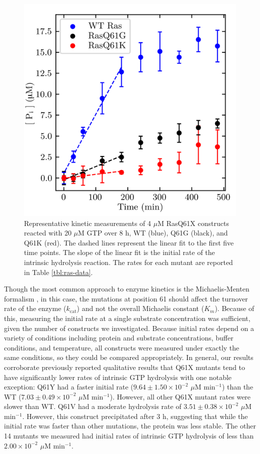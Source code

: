 \begin{figure}
    \center
    \includegraphics[width=\single]{figures-ras/modelCurvesFigure.png}
    \caption{
        Representative kinetic measurements of 4 $\mu$M RasQ61X constructs reacted with 20 $\mu$M GTP over 8 h, WT (blue), Q61G (black), and Q61K (red). 
        The dashed lines represent the linear fit to the first five time points. 
        The slope of the linear fit is the initial rate of the intrinsic hydrolysis reaction. 
        The rates for each mutant are reported in Table \ref{tbl:ras-data}.}
    \label{fig:ras-curves}
\end{figure}

Though the most common approach to enzyme kinetics is the Michaelis-Menten formalism \cite{Michaelis1913, Johnson2011}, in this case, the mutations at position 61 should affect the turnover rate of the enzyme ($k_{\text{cat}}$) and not the overall Michaelis constant ($K_m$). 
Because of this, measuring the initial rate at a single substrate concentration was sufficient, given the number of constructs we investigated. 
Because initial rates depend on a variety of conditions including protein and substrate concentrations, buffer conditions, and temperature, all constructs were measured under exactly the same conditions, so they could be compared appropriately. 
In general, our results corroborate previously reported qualitative results that Q61X mutants tend to have significantly lower rates of intrinsic GTP hydrolysis with one notable exception: Q61Y had a faster initial rate ($9.64 \pm 1.50 \times 10^{-2}$ $\mu$M min$^{-1}$) than the WT ($7.03 \pm 0.49 \times 10^{-2}$ $\mu$M min$^{-1}$). 
However, all other Q61X mutant rates were slower than WT. 
Q61V had a moderate hydrolysis rate of $3.51 \pm 0.38 \times 10^{-2}$ $\mu$M min$^{-1}$. 
However, this construct precipitated after 3 h, suggesting that while the initial rate was faster than other mutations, the protein was less stable. 
The other 14 mutants we measured had initial rates of intrinsic GTP hydrolysis of less than $2.00 \times 10^{-2}$ $\mu$M min$^{-1}$.

